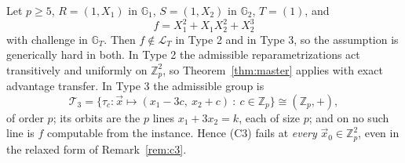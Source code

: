 \documentclass{conjura-solution}
\newcommand{\Gone}{\mathbb{G}_1}
\newcommand{\Gtwo}{\mathbb{G}_2}
\newcommand{\GT}{\mathbb{G}_T}
\newcommand{\Zp}{\mathbb{Z}_p}
\newcommand{\vx}{\vec{x}}
\newcommand{\LL}{\mathcal{L}}
\begin{document}
\begin{proposition}
\label{prop:sep}
Let $p\ge 5$, $R=(1,X_1)$ in $\Gone$, $S=(1,X_2)$ in $\Gtwo$, $T=(1)$, and
\[
  f=X_1^{2}+X_1X_2^{2}+X_2^{3}
\]
with challenge in $\GT$. Then $f\notin\LL_T$ in Type 2 and in Type 3, so the assumption is
generically hard in both. In Type 2 the admissible reparametrizations act transitively and
uniformly on $\Zp^{2}$, so Theorem~\ref{thm:master} applies with exact advantage transfer. In
Type 3 the admissible group is
\[
  \mathcal T_3=\{\tau_c\colon\vx\mapsto(x_1-3c,\ x_2+c)\ :\ c\in\Zp\}\cong(\Zp,+),
\]
of order $p$; its orbits are the $p$ lines $x_1+3x_2=k$, each of size $p$; and on no such line
is $f$ computable from the instance. Hence \textup{(C3)} fails at \emph{every}
$\vx_0\in\Zp^{2}$, even in the relaxed form of Remark~\ref{rem:c3}.
\end{proposition}
\end{document}
